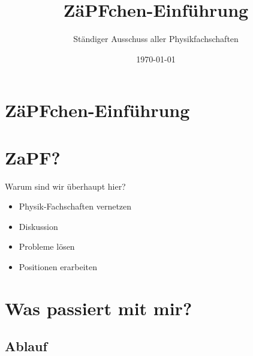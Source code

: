 \documentclass[compress,]{beamer}
\title[ZäPFchen-Einführung]{ZäPFchen-Einführung}
\author{Ständiger Ausschuss aller Physikfachschaften}
\institute[Zusammenkunft aller Physikfachschaften]
\date{\today}
\begin{document}
\begin{frame}
  \titlepage

\end{frame}

\section{ZäPFchen-Einführung}


\section{ZaPF?}

\begin{frame}{Warum sind wir überhaupt hier?}

  \begin{itemize}
  \item Physik-Fachschaften vernetzen
  \item Diskussion
  \item Probleme lösen
  \item Positionen erarbeiten
  \end{itemize}

\end{frame}


\section{Was passiert mit mir?}

\subsection{Ablauf}
\end{document}

